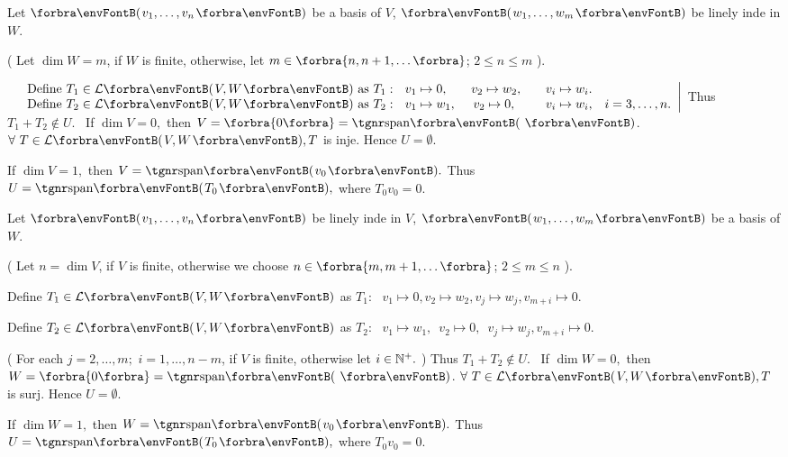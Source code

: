 \documentclass[a4paper, 11pt, UTF8]{article}
\begin{document}
\begin{large}
\par\quad
Let $\Par{v_1,\dots,v_n}$ be a basis of $V$, $\Par{w_1,\dots,w_m}$ be linely inde in $W$.\par\quad
( Let $\dim W=m$, if $W$ is finite, otherwise, let $m\in\Bra{n,n+1,\dots}$; $2\leqslant n\leqslant m$ ).\par\,
$\MathRightMid{l}{$
Define $T_1\in\Lm{V,W}$ as $T_1:\,\,\,\,v_1\mapsto 0,$\qquad$v_2\mapsto w_2,$\qquad$v_i\mapsto w_i$.$\\$
Define $T_2\in\Lm{V,W}$ as $T_2:\,\,\,\,v_1\mapsto w_1,$ \quad\,$v_2\mapsto 0,$\,\,\,\qquad$v_i\mapsto w_i$,\quad $i=3,\dots,n.}$ Thus $T_1+T_2\not\in U.$\PfEnd\vspace{10pt}
\Comment \,\,\,If $\dim V=0,$ then $V=\zeroSubs=\Span{\,}$. $\forall\,\,T\in\Lm{V,W}, T$ is inje. Hence $U=\emptyset$.\par
\Blind{\Comment\,\,\,}If $\dim V=1,$ then $V=\Span{v_0}.$ Thus $U=\Span{T_0},$ where $T_0 v_0=0.$\par
\SepLine

\par\quad
Let $\Par{v_1,\dots,v_n}$ be linely inde in $V$, $\Par{w_1,\dots,w_m}$ be a basis of $W$.\par\quad
( Let $n=\dim V$, if $V$ is finite, otherwise we choose $n\in\Bra{m,m+1,\dots}$; $2\leqslant m\leqslant n$ ).\par\quad
Define $T_1\in\Lm{V,W}$ as $T_1:\,\,\,\,v_1\mapsto 0,$\qquad$v_2\mapsto w_2,$\qquad$v_j\mapsto w_j,$\qquad$v_{m+i}\mapsto 0.$\par\quad
Define $T_2\in\Lm{V,W}$ as $T_2:\,\,\,\,v_1\mapsto w_1,$\,\,\,\quad$v_2\mapsto 0,$\,\,\,\qquad$v_j\mapsto w_j,$\qquad$v_{m+i}\mapsto 0.$\par\quad
( For each $j=2,\dots,m;\,\,i=1,\dots,n-m$, if $V$ is finite, otherwise let $i\in{\mathbb{N}^+}.$ ) Thus $T_1+T_2\not\in U.$\PfEnd\vspace{10pt}
\Comment \,\,\,If $\dim W=0,$ then $W=\zeroSubs=\Span{\,}$. $\forall\,\,T\in\Lm{V,W}, T$ is surj. Hence $U=\emptyset.$\par
\Blind{\Comment\,\,\,}If $\dim W=1,$ then $W=\Span{v_0}.$ Thus $U=\Span{T_0},$ where $T_0 v_0=0.$\par
\SepLine


\end{large}
\end{document}
